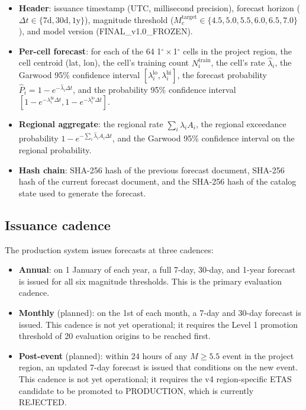 \documentclass[10pt,a4paper,twocolumn]{article}
\begin{document}
\begin{itemize}[leftmargin=1.2em,itemsep=2pt,topsep=2pt]
\item \textbf{Header}: issuance timestamp (UTC, millisecond precision), forecast horizon ($\Delta t \in \{7\text{d}, 30\text{d}, 1\text{y}\}$), magnitude threshold ($M_c^{\text{target}}\in\{4.5, 5.0, 5.5, 6.0, 6.5, 7.0\}$), and model version (FINAL\_v1.0\_FROZEN).
\item \textbf{Per-cell forecast}: for each of the 64 1$^\circ\times$1$^\circ$ cells in the project region, the cell centroid (lat, lon), the cell's training count $N_i^{\text{train}}$, the cell's rate $\hat\lambda_i$, the Garwood 95\% confidence interval $[\lambda_i^{\text{lo}}, \lambda_i^{\text{hi}}]$, the forecast probability $\hat P_i = 1 - e^{-\hat\lambda_i \Delta t}$, and the probability 95\% confidence interval $[1 - e^{-\lambda_i^{\text{hi}} \Delta t}, 1 - e^{-\lambda_i^{\text{lo}} \Delta t}]$.
\item \textbf{Regional aggregate}: the regional rate $\sum_i \hat\lambda_i A_i$, the regional exceedance probability $1 - e^{-\sum_i \hat\lambda_i A_i \Delta t}$, and the Garwood 95\% confidence interval on the regional probability.
\item \textbf{Hash chain}: SHA-256 hash of the previous forecast document, SHA-256 hash of the current forecast document, and the SHA-256 hash of the catalog state used to generate the forecast.
\end{itemize}

\subsection{Issuance cadence}

The production system issues forecasts at three cadences:

\begin{itemize}[leftmargin=1.2em,itemsep=2pt,topsep=2pt]
\item \textbf{Annual}: on 1 January of each year, a full 7-day, 30-day, and 1-year forecast is issued for all six magnitude thresholds. This is the primary evaluation cadence.
\item \textbf{Monthly} (planned): on the 1st of each month, a 7-day and 30-day forecast is issued. This cadence is not yet operational; it requires the Level 1 promotion threshold of 20 evaluation origins to be reached first.
\item \textbf{Post-event} (planned): within 24 hours of any $M\geq5.5$ event in the project region, an updated 7-day forecast is issued that conditions on the new event. This cadence is not yet operational; it requires the v4 region-specific ETAS candidate to be promoted to PRODUCTION, which is currently REJECTED.
\end{itemize}
\end{document}
